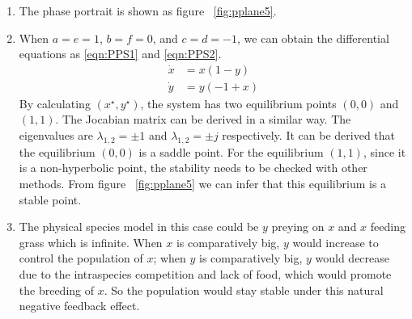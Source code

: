 \begin{enumerate}

\item The phase portrait is shown as figure ~\ref{fig:pplane5}.
\item When 
$a=e=1$, $b=f=0$, and $c=d=-1$,
  we can obtain the differential equations as \eqref{eqn:PPS1} and \eqref{eqn:PPS2}.
\begin{subequations} \label{eqn:PPS}
\begin{align}
    \dot{x} &= x(1-y)  \label{eqn:PPS1}\\ 
    \dot{y} &= y(-1+x) \label{eqn:PPS2}
\end{align}
\end{subequations}
By calculating $(x^\star,y^\star)$, the system has two equilibrium points $(0,0)$ and $(1,1)$. The Jocabian matrix can be derived in a similar way. The eigenvalues are $\lambda_{1,2} = \pm 1$ and $\lambda_{1,2} = \pm j$ respectively. It can be derived that the equilibrium $(0,0)$ is a saddle point. For the equilibrium $(1,1)$, since it is a non-hyperbolic point, the stability needs to be checked with other methods. From figure ~\ref{fig:pplane5} we can infer that this equilibrium is a stable point. 
\item The physical species model in this case could be $y$ preying on $x$ and $x$ feeding grass which is infinite. When $x$ is comparatively big, $y$ would increase to control the population of $x$; when $y$ is comparatively big, $y$ would decrease due to the intraspecies competition and lack of food, which would promote the breeding of $x$. So the population would stay stable under this natural negative feedback effect.  
\end{enumerate}